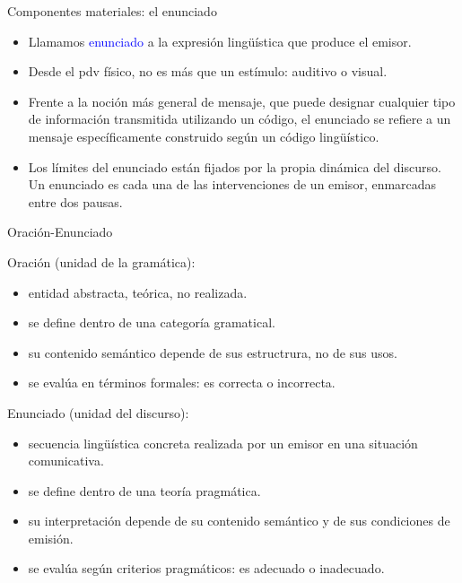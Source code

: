 \documentclass{beamer}
\begin{document}
\begin{frame}{Componentes materiales: el enunciado}

\begin{itemize}
	\item Llamamos \textcolor{blue}{enunciado} a la expresión lingüística que produce el emisor.
	\item Desde el pdv físico, no es más que un estímulo: auditivo o visual.
	\item Frente a la noción más general de mensaje, que puede designar cualquier tipo de información transmitida utilizando un código, el enunciado se refiere a un mensaje específicamente construido según un código lingüístico.
	\item Los límites del enunciado están fijados por la propia dinámica del discurso. Un enunciado es cada una de las intervenciones de un emisor, enmarcadas entre dos pausas. 
\end{itemize}

\end{frame}

\begin{frame}{Oración-Enunciado}

Oración (unidad de la gramática):

\begin{itemize}
	\item entidad abstracta, teórica, no realizada.
	\item se define dentro de una categoría gramatical.
	\item su contenido semántico depende de sus estructrura, no de sus usos.
	\item se evalúa en términos formales: es correcta o incorrecta.
\end{itemize}

Enunciado (unidad del discurso):

\begin{itemize}
	\item secuencia lingüística concreta realizada por un emisor en una situación comunicativa.
	\item se define dentro de una teoría pragmática.
	\item su interpretación depende de su contenido semántico y de sus condiciones de emisión.
	\item se evalúa según criterios pragmáticos: es adecuado o inadecuado.
\end{itemize}


\end{frame}
\end{document}

